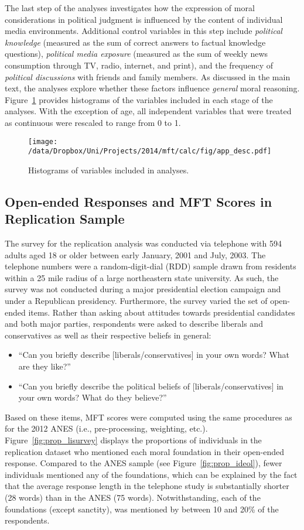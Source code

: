 The last step of the analyses investigates how the expression of moral considerations in political judgment is influenced by the content of individual media environments. Additional control variables in this step include \textit{political knowledge} (measured as the sum of correct answers to factual knowledge questions), \textit{political media exposure} (measured as the sum of weekly news consumption through TV, radio, internet, and print), and the frequency of \textit{political discussions} with friends and family members. As discussed in the main text, the analyses explore whether these factors influence \textit{general} moral reasoning. Figure~\ref{fig:app_desc} provides histograms of the variables included in each stage of the analyses. With the exception of age, all independent variables that were treated as continuous were rescaled to range from 0 to 1.

\begin{figure}[h]\centering
\texttt{[image: /data/Dropbox/Uni/Projects/2014/mft/calc/fig/app\_desc.pdf]}
\caption[Histograms of variables included in analyses]{Histograms of variables included in analyses.}\label{fig:app_desc}
\end{figure}


\clearpage
\subsection{Open-ended Responses and MFT Scores in Replication Sample}

The survey for the replication analysis was conducted via telephone with 594 adults aged 18 or older between early January, 2001 and July, 2003. The telephone numbers were a random-digit-dial (RDD) sample drawn from residents within a 25 mile radius of a large northeastern state university. As such, the survey was not conducted during a  major presidential election campaign and under a Republican presidency. Furthermore, the survey varied the set of open-ended items. Rather than asking about attitudes towards presidential candidates and both major parties, respondents were asked to describe liberals and conservatives as well as their respective beliefs in general:
\begin{itemize}
\item ``Can you briefly describe [liberals/conservatives] in your own words? What are they like?''
\item ``Can you briefly describe the political beliefs of [liberals/conservatives] in your own words? What do they believe?''
\end{itemize}
Based on these items, MFT scores were computed using the same procedures as for the 2012 ANES (i.e., pre-processing, weighting, etc.). Figure~\ref{fig:prop_lisurvey} displays the proportions of individuals in the replication dataset who mentioned each moral foundation in their open-ended response. Compared to the ANES sample (see Figure~\ref{fig:prop_ideol}), fewer individuals mentioned any of the foundations, which can be explained by the fact that the average response length in the telephone study is substantially shorter (28 words) than in the ANES (75 words). Notwithstanding, each of the foundations (except sanctity), was mentioned by between 10 and 20\% of the respondents.


